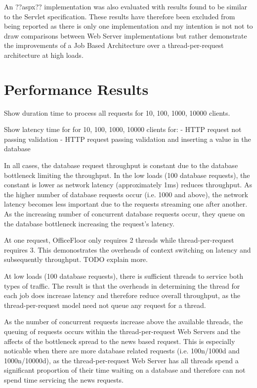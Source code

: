 \documentclass[conference]{ieee/IEEEtran}
\begin{document}
An ??aspx?? implementation was also evaluated with results found to be similar
to the Servlet specification.  These results have therefore been excluded from
being reported as there is only one implementation and my intention is not not
to draw comparisons between Web Server implementations but rather demonstrate
the improvements of a Job Based Architecture over a thread-per-request
architecture at high loads.
   
   

\section{Performance Results}
Show duration time to process all requests for 10, 100, 1000, 10000 clients.
  
Show latency time for for 10, 100, 1000, 10000 clients for:
        - HTTP request not passing validation
        - HTTP request passing validation and inserting a value in the database
       
In all cases, the database request throughput is constant due to the database
bottleneck limiting the throughput.  In the low loads (100 database requests),
the constant is lower as network latency (approximately 1ms) reduces
throughput.  As the higher number of database requests occur (i.e. 1000 and
above), the network latency becomes less important due to the requests
streaming one after another.  As the increasing number of concurrent database
requests occur, they queue on the database bottleneck increasing the request's
latency.
   
At one request, OfficeFloor only requires 2 threads while thread-per-request
requires 3.  This demonostrates the overheads of context switching on latency
and subsequently throughput.  TODO explain more.
       
At low loads (100 database requests), there is sufficient threads to service
both types of traffic.  The result is that the overheads in determining the
thread for each job does increase latency and therefore reduce overall
throughput, as the thread-per-request model need not queue any request for a
thread.
   
As the number of concurrent requests increase above the available threads, the
queuing of requests occurs within the thread-per-request Web Servers and the
affects of the bottleneck spread to the news based request.  This is especially
noticable when there are more database related requests (i.e. 100n/1000d and
1000n/10000d), as the thread-per-request Web Server has all threads spend a
significant proportion of their time waiting on a database and therefore can
not spend time servicing the news requests.
   
\end{document}

